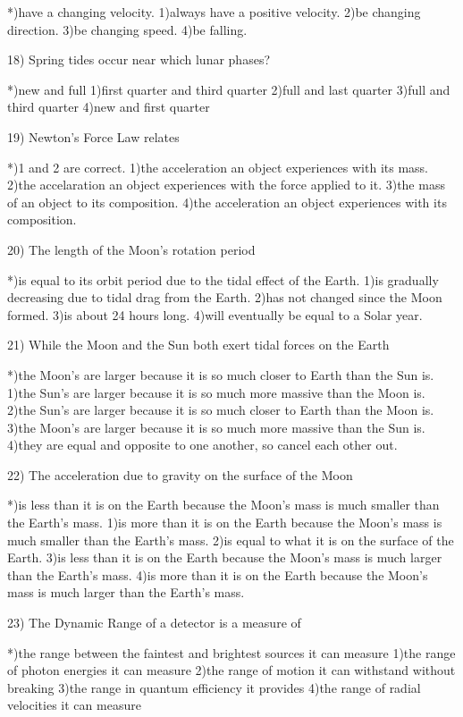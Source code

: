  *)have a changing velocity.
 1)always have a positive velocity.
 2)be changing direction.
 3)be changing speed.
 4)be falling.
 
18) Spring tides occur near which lunar phases?
 
 *)new and full
 1)first quarter and third quarter
 2)full and last quarter
 3)full and third quarter
 4)new and first quarter
 
19) Newton's Force Law relates
 
 *)1 and 2 are correct.
 1)the acceleration an object experiences with its mass.
 2)the accelaration an object experiences with the force applied to it.
 3)the mass of an object to its composition.
 4)the acceleration an object experiences with its composition.
 
20) The length of the Moon's rotation period
 
 *)is equal to its orbit period due to the tidal effect of the Earth.
 1)is gradually decreasing due to tidal drag from the Earth.
 2)has not changed since the Moon formed.
 3)is about 24 hours long.
 4)will eventually be equal to a Solar year.
 
21) While the Moon and the Sun both exert tidal forces on the Earth
 
 *)the Moon's are larger because it is so much closer to Earth than
   the Sun is.
 1)the Sun's are larger because it is so much more massive than the
   Moon is.
 2)the Sun's are larger because it is so much closer to Earth than the
   Moon is.
 3)the Moon's are larger because it is so much more massive than the
   Sun is.
 4)they are equal and opposite to one another, so cancel each other out.
 
22) The acceleration due to gravity on the surface of the Moon
 
 *)is less than it is on the Earth because the Moon's mass is much
   smaller than the Earth's mass.
 1)is more than it is on the Earth because the Moon's mass is much
   smaller than the Earth's mass.
 2)is equal to what it is on the surface of the Earth.
 3)is less than it is on the Earth because the Moon's mass is much
   larger than the Earth's mass.
 4)is more than it is on the Earth because the Moon's mass is much
   larger than the Earth's mass.
 
23) The Dynamic Range of a detector is a measure of 
 
 *)the range between the faintest and brightest sources it can measure
 1)the range of photon energies it can measure
 2)the range of motion it can withstand without breaking
 3)the range in quantum efficiency it provides
 4)the range of radial velocities it can measure
 
